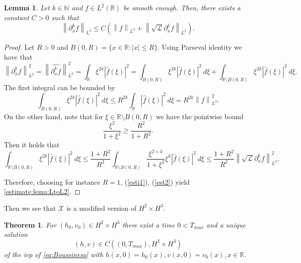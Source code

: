 \documentclass[final,11pt,a4paper,reqno]{amsart}
\newcommand{\norm}[1]{\left\| #1 \right\|}
\newcommand{\RR}{\mathbb R}
\newcommand{\pa}{\partial}
\newtheorem{theorem}{Theorem}
\newtheorem{lemma}[satz]{Lemma}
\theoremstyle{definition}
\begin{document}
\begin{lemma}\label{lema:LtoL2}
Let  $k\in \mathbb{N}$ and $f\in L^{2}(\RR)$ be smooth enough. Then, there exists a constant $C>0$ such that 
\begin{equation}\label{estimate:lema:LtoL2}
\norm{\pa_{x}^{k}f}_{L^{2}} \leq C\left(\norm{f}_{L^{2}}+\norm{\sqrt{\mathscr{L}}\pa_{x}^{k}f}_{L^{2}}\right).
\end{equation}
\end{lemma}
\begin{proof}
Let $R>0$ and ${B(0,R)}=\{ x\in\mathbb{R}: |x|\leq R\}$. 
Using Parseval identity we have that
\[
\norm{\pa_{x}^{k}f}_{L^{2}}^{2}=\norm{\widehat{\pa_{x}^{k}f}}_{L^2}^{2}=\int_{\RR} \xi^{2k}|\hat{f}(\xi)|^{2}=\int_{B(0,R)} \xi^{2k}|\hat{f}(\xi)|^{2} \  d\xi +\int_{\mathbb{R}\setminus B(0,R)} \xi^{2k}|\hat{f}(\xi)|^{2} \  d\xi .
\]
The first integral can be bounded  by
\begin{equation}\label{esti1}
\int_{B(0,R)} \xi^{2k}|\hat{f}(\xi)|^{2} \  d\xi \leq R^{2k}\int_{\mathbb{R}} |\hat{f}(\xi)|^{2} \  d\xi = R^{2k}\norm{f}_{L^{2}}^{2}.
\end{equation}
On the other hand, note that for $\xi\in \mathbb{R}\setminus B(0,R)$ we have the pointwise bound
\[\frac{\xi^{2}}{1+\xi^{2}}\geq \frac{R^{2}}{1+R^{2}}.\]
Then it holds that
\begin{equation}\label{est2}
\int_{\mathbb{R}\setminus B(0,R)} \xi^{2k}|\hat{f}(\xi)|^{2} \  d\xi \leq  \frac{1+R^{2}}{R^{2}} \int_{\mathbb{R}\setminus B(0,R)}  \frac{\xi^{2+k}}{1+\xi^{2}}\xi^{k}  |\hat{f}(\xi)|^{2} \  d\xi \leq  \frac{1+R^{2}}{R^{2}} \norm{\sqrt{\mathscr{L}}\pa_{x}^{k}f}_{L^{2}}^{2}.
\end{equation}

Therefore, choosing for instance $R=1$, (\ref{esti1}), (\ref{est2}) yield \eqref{estimate:lema:LtoL2}.
\end{proof}

Then we see that $\mathcal{X}$ is a modified version of $H^2\times H^3$.
\begin{theorem}\label{theoremBouss}
For $(h_0,v_0)\in H^2\times H^3$  there exist a time $0<T_{max}$ and a unique solution 
\[ (h,v)\in C((0,T_{max}), H^2\times H^3)\]
of the ivp of \eqref{eq:Boussinesq} with $h(x,0)=h_{0}(x), v(x,0)=v_{0}(x), x\in\mathbb{R}$.
\end{theorem}
\end{document}
